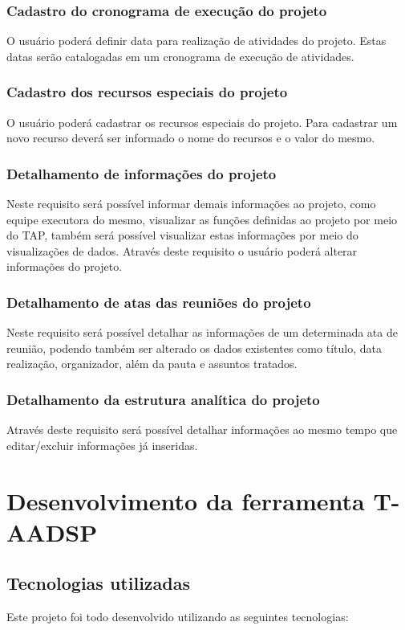 \documentclass{acm_proc_article-sp}
\begin{document}
\subsubsection{Cadastro do cronograma de execução do projeto}
O usuário poderá definir data para realização de atividades do projeto. Estas datas serão catalogadas em um cronograma de execução de atividades.

\subsubsection{Cadastro dos recursos especiais do projeto}
O usuário poderá cadastrar os recursos especiais do projeto. Para cadastrar um novo recurso deverá ser informado o nome do recursos e o valor do mesmo.

\subsubsection{Detalhamento de informações do projeto}
Neste requisito será possível informar demais informações ao projeto, como equipe executora do mesmo, visualizar as funções definidas ao projeto por meio do TAP, também será possível visualizar estas informações por meio do visualizações de dados. Através deste requisito o usuário poderá alterar informações do projeto. 

\subsubsection{Detalhamento de atas das reuniões do projeto}
Neste requisito será possível detalhar as informações de um determinada ata de reunião, podendo também ser alterado os dados existentes como título, data realização, organizador, além da pauta e assuntos tratados.

\subsubsection{Detalhamento da estrutura analítica do projeto}
Através deste requisito será possível detalhar informações ao mesmo tempo que editar/excluir informações já inseridas.

\section{Desenvolvimento da ferramenta T-AADSP}
\subsection{Tecnologias utilizadas}
Este projeto foi todo desenvolvido utilizando as seguintes tecnologias:
\end{document}

